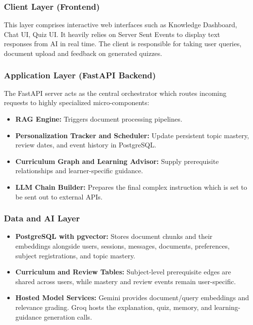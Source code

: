 \documentclass[11pt, a4paper, oneside]{report}
\begin{document}
\subsubsection{Client Layer (Frontend)}
This layer comprises interactive web interfaces such as Knowledge Dashboard, Chat UI,
Quiz UI. It heavily relies on Server Sent Events to display text responses from AI in real
time. The client is responsible for taking user queries, document upload and feedback on
generated quizzes.

\subsubsection{Application Layer (FastAPI Backend)}
The FastAPI server acts as the central orchestrator which routes incoming requests to highly
specialized micro-components:
\begin{itemize}[leftmargin=2em]
  \item \textbf{RAG Engine:} Triggers document processing pipelines.
  \item \textbf{Personalization Tracker and Scheduler:} Update persistent topic mastery, review dates, and event history in PostgreSQL.
  \item \textbf{Curriculum Graph and Learning Advisor:} Supply prerequisite relationships and learner-specific guidance.
  \item \textbf{LLM Chain Builder:} Prepares the final complex instruction which is
        set to be sent out to external APIs.
\end{itemize}

\subsubsection{Data and AI Layer}
\begin{itemize}[leftmargin=2em]
  \item \textbf{PostgreSQL with pgvector:} Stores document chunks and their embeddings alongside users, sessions, messages, documents, preferences, subject registrations, and topic mastery.
  \item \textbf{Curriculum and Review Tables:} Subject-level prerequisite edges are shared across users, while mastery and review events remain user-specific.
  \item \textbf{Hosted Model Services:} Gemini provides document/query embeddings and relevance grading. Groq hosts the explanation, quiz, memory, and learning-guidance generation calls.
\end{itemize}
\end{document}
